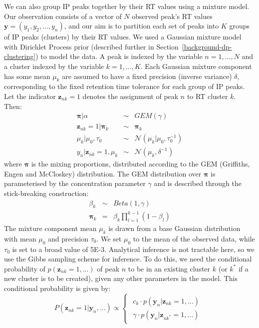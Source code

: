 We can also group IP peaks together by their RT values using a mixture model. Our observation consists of a vector of $N$ observed peak's RT values $\mathbf{y}=(y_{1},y_{2},...,y_{n})$, and our aim is to partition each set of peaks into $K$ groups of IP peaks (clusters) by their RT values. We used a Gaussian mixture model with Dirichlet Process prior (described further in Section~\ref{background-dp-clustering}) to model the data. A peak is indexed by the variable $n=1,...,N$ and a cluster indexed by the variable $k=1,...,K$. Each Gaussian mixture component has some mean $\mu_{k}$ are assumed to have a fixed precision (inverse variance) $\delta$, corresponding to the fixed retention time tolerance for each group of IP peaks. Let the indicator $\boldsymbol{z}_{nk}=1$ denotes the assignment of peak $n$ to RT cluster $k$. Then: 
\begin{eqnarray}
\boldsymbol{\pi}|\alpha & \sim & GEM(\gamma)\\
\boldsymbol{z}_{nk}=1|\boldsymbol{\pi}_{k} & \sim & \boldsymbol{\pi}_{k}\\
\mu_{k}|\mu_{0},\tau_{0} & \sim & \mathcal{N}(\mu_{k}|\mu_{0},\tau_{0}^{-1})\\
y_{n}|\boldsymbol{z}_{nk}=1,\mu_{k} & \sim & \mathcal{N}(\mu_{k},\delta^{-1})
\end{eqnarray}
where $\boldsymbol{\pi}$ is the mixing proportions, distributed according to the GEM (Griffiths, Engen and McCloskey) distribution. The GEM distribution over $\boldsymbol{\pi}$ is parameterised by the concentration parameter $\gamma$ and is described through the stick-breaking construction:
\begin{eqnarray}
\beta_{k} & \sim & Beta(1,\gamma)\\
\boldsymbol{\pi}_{k} & = & \beta_{k}\prod_{l=1}^{k-1}(1-\beta_{l})
\end{eqnarray}
The mixture component mean $\mu_{k}$ is drawn from a base Gaussian distribution with mean $\mu_{0}$ and precision $\tau_{0}$. We set $\mu_{0}$ to the mean of the observed data, while $\tau_{0}$ is set to a broad value of 5E-3. Analytical inference is not tractable here, so we use the Gibbs sampling scheme for inference. To do this, we need the conditional probability of $p(\boldsymbol{z}_{nk}=1,...)$ of peak $n$ to be in an existing cluster $k$ (or $k^{*}$ if a new cluster is to be created), given any other parameters in the model. This conditional probability is given by:
\begin{equation}
P(\boldsymbol{z}_{nk}=1|\mathbf{y}_{n},\ldots)\propto\begin{cases}
\begin{array}{c}
c_{k}\cdot p(\mathbf{y}_{n}|\boldsymbol{z}_{nk}=1,...)\\
\gamma\cdot p(\mathbf{y}_{n}|\boldsymbol{z}_{nk^{*}}=1,...)
\end{array}\end{cases}\label{eq:table_likelihood}
\end{equation}
